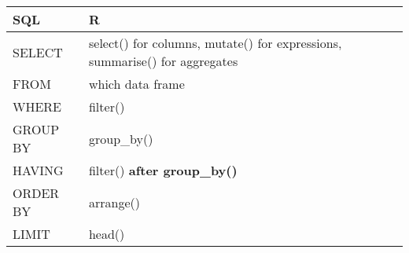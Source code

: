 \documentclass[
]{book}
\begin{document}
\begin{longtable}[]{@{}ll@{}}
\toprule
\begin{minipage}[b]{0.14\columnwidth}\raggedright
SQL\strut
\end{minipage} & \begin{minipage}[b]{0.80\columnwidth}\raggedright
R\strut
\end{minipage}\tabularnewline
\midrule
\endhead
\begin{minipage}[t]{0.14\columnwidth}\raggedright
SELECT\strut
\end{minipage} & \begin{minipage}[t]{0.80\columnwidth}\raggedright
select() for columns, mutate() for expressions, summarise() for aggregates\strut
\end{minipage}\tabularnewline
\begin{minipage}[t]{0.14\columnwidth}\raggedright
FROM\strut
\end{minipage} & \begin{minipage}[t]{0.80\columnwidth}\raggedright
which data frame\strut
\end{minipage}\tabularnewline
\begin{minipage}[t]{0.14\columnwidth}\raggedright
WHERE\strut
\end{minipage} & \begin{minipage}[t]{0.80\columnwidth}\raggedright
filter()\strut
\end{minipage}\tabularnewline
\begin{minipage}[t]{0.14\columnwidth}\raggedright
GROUP BY\strut
\end{minipage} & \begin{minipage}[t]{0.80\columnwidth}\raggedright
group\_by()\strut
\end{minipage}\tabularnewline
\begin{minipage}[t]{0.14\columnwidth}\raggedright
HAVING\strut
\end{minipage} & \begin{minipage}[t]{0.80\columnwidth}\raggedright
filter() \textbf{after group\_by()}\strut
\end{minipage}\tabularnewline
\begin{minipage}[t]{0.14\columnwidth}\raggedright
ORDER BY\strut
\end{minipage} & \begin{minipage}[t]{0.80\columnwidth}\raggedright
arrange()\strut
\end{minipage}\tabularnewline
\begin{minipage}[t]{0.14\columnwidth}\raggedright
LIMIT\strut
\end{minipage} & \begin{minipage}[t]{0.80\columnwidth}\raggedright
head()\strut
\end{minipage}\tabularnewline
\bottomrule
\end{longtable}
\end{document}
